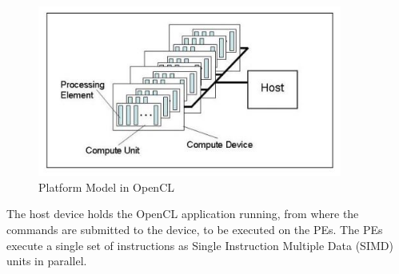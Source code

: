 \begin{figure}[h!]
  \centering
  \includegraphics[width=10cm]{figures/OpenCL_Platform_Model.JPG}
  \caption{Platform Model in OpenCL}
  \label{fig:opencl1}
\end{figure}
The host device holds the OpenCL application running, from where the commands are submitted to the device, to be executed on the PEs. The PEs execute a single set of instructions as Single Instruction Multiple Data (SIMD) units in parallel. 


